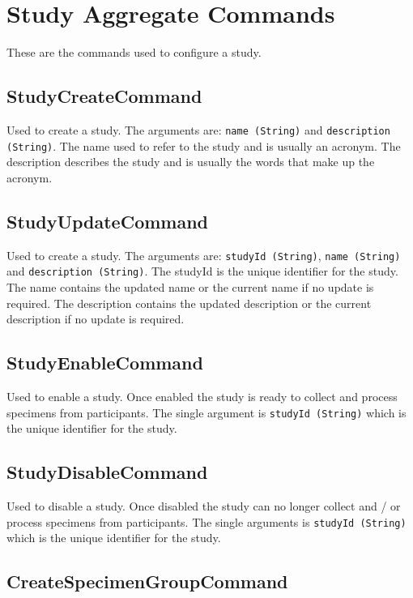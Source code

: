\section {Study Aggregate Commands}
These are the commands used to configure a study.

\subsection*{StudyCreateCommand}

Used to create a study. The arguments are: \texttt{name (String)} and
\texttt{description (String)}. The name used to refer to the study and is
usually an acronym. The description describes the study and is usually the
words that make up the acronym.

\subsection*{StudyUpdateCommand}

Used to create a study. The arguments are: \texttt{studyId (String)},
\texttt{name (String)} and \texttt{description (String)}. The studyId is the
unique identifier for the study. The name contains the updated name or the
current name if no update is required. The description contains the updated
description or the current description if no update is required.

\subsection*{StudyEnableCommand}

Used to enable a study. Once enabled the study is ready to collect and process
specimens from participants. The single argument is \texttt{studyId (String)}
which is the unique identifier for the study.

\subsection*{StudyDisableCommand}

Used to disable a study. Once disabled the study can no longer collect and / or
process specimens from participants. The single arguments is \texttt{studyId
  (String)} which is the unique identifier for the study.

\subsection*{CreateSpecimenGroupCommand}

